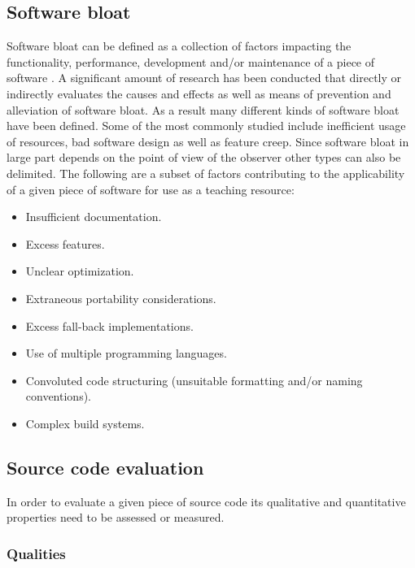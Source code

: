 \subsection{Software bloat}

Software bloat can be defined as a collection of factors impacting the functionality, performance, development and/or maintenance of a piece of software \cite{McGrenere2000AreWA,McGrenere2000BloatTO,Quach2018DebloatingST,Quach2019BloatFA}. A significant amount of research has been conducted that directly or indirectly evaluates the causes \cite{Mitchell2010FourTL} and effects \cite{Quach2019BloatFA} as well as means of prevention \cite{Pike2007ProgramDI,Milicchio2007TheUK} and alleviation \cite{Quach2018DebloatingST} of software bloat. As a result many different kinds of software bloat have been defined. Some of the most commonly studied include inefficient usage of resources, bad software design as well as feature creep. Since software bloat in large part depends on the point of view of the observer other types can also be delimited. The following are a subset of factors contributing to the applicability of a given piece of software for use as a teaching resource:

\begin{itemize}
    \item Insufficient documentation.
    \item Excess features.
    \item Unclear optimization.
    \item Extraneous portability considerations.
    \item Excess fall-back implementations.
    \item Use of multiple programming languages.
    \item Convoluted code structuring (unsuitable formatting and/or naming conventions).
    \item Complex build systems.
\end{itemize}

\subsection{Source code evaluation}

In order to evaluate a given piece of source code its qualitative and quantitative properties need to be assessed or measured. 

\subsubsection{Qualities}

